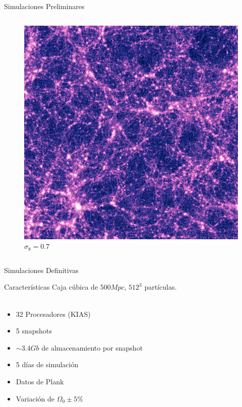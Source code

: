\documentclass{beamer}
\begin{document}
\begin{frame}{Simulaciones Preliminares}
\begin{columns}
		\begin{column}{0.5\textwidth}
			\begin{figure}[!h]
			\begin{center}
				\includegraphics[width=\textwidth]{im/res2.png}
				\caption{$\sigma_8=0.7$} 
				\label{fig:res2}
			\end{center}
		\end{figure}
		\end{column}
	\end{columns}
\end{frame}
\begin{frame}{Simulaciones Definitivas}
	\begin{block}{Características}
		Caja cúbica de $500 Mpc$, $512^3$ partículas.\\~\\
		\begin{itemize}
			\item 32 Procesadores (KIAS)
			\item 5 snapshots
			\item $\sim 3.4Gb$ de almacenamiento por snapshot
			\item 5 días de simulación
			\item Datos de Plank
			\item Variación de $\Omega_0\pm5\%$
		\end{itemize}
	\end{block}		
	
\end{frame}
\end{document}
